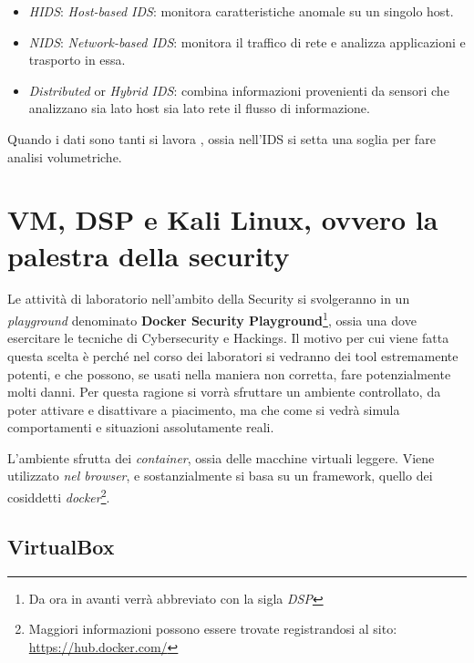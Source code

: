 \documentclass[14pt]{extreport}
\begin{document}
\begin{itemize}
    \item \textit{HIDS}: \textit{Host-based IDS}: monitora caratteristiche anomale su un singolo host.
    
    \item \textit{NIDS}: \textit{Network-based IDS}: monitora il traffico di rete e analizza applicazioni e trasporto in essa.
    
    \item \textit{Distributed} or \textit{Hybrid IDS}: combina informazioni provenienti da sensori che analizzano sia lato host sia lato rete il flusso di informazione.
\end{itemize}
Quando i dati sono tanti si lavora , ossia nell'IDS si setta una soglia per fare analisi volumetriche.



















\appendix
\chapter{VM, DSP e Kali Linux, ovvero la palestra della security}
Le attività di laboratorio nell'ambito della Security si svolgeranno in un \textit{playground} denominato \textbf{Docker Security Playground}\footnote{Da ora in avanti verrà abbreviato con la sigla \textit{DSP}}, ossia una  dove esercitare le tecniche di Cybersecurity e Hackings. Il motivo per cui viene fatta questa scelta è perché nel corso dei laboratori si vedranno dei tool estremamente potenti, e che possono, se usati nella maniera non corretta, fare potenzialmente molti danni. Per questa ragione si vorrà sfruttare un ambiente controllato, da poter attivare e disattivare a piacimento, ma che come si vedrà simula comportamenti e situazioni assolutamente reali.

L'ambiente sfrutta dei \textit{container}, ossia delle macchine virtuali leggere.
Viene utilizzato \textit{nel browser}, e sostanzialmente si basa su un framework, quello dei cosiddetti \textit{docker}\footnote{Maggiori informazioni possono essere trovate registrandosi al sito: \url{https://hub.docker.com/}}.


\section{VirtualBox}
\end{document}
